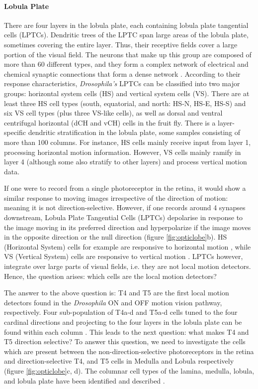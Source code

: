 \paragraph{Lobula Plate}
There are four layers in the lobula plate, each containing lobula plate tangential cells (LPTCs). Dendritic trees of the LPTC span large areas of the lobula plate, sometimes covering the entire layer. Thus, their receptive fields cover a large portion of the visual field. The neurons that make up this group are composed of more than 60 different types, and they form a complex network of electrical and chemical synaptic connections that form a dense network \parencite{Borst2010}. According to their response characteristics, \textit{Drosophila's} LPTCs can be classified into two major groups: horizontal system cells (HS) and vertical system cells (VS). There are at least three HS cell types (south, equatorial, and north: HS-N, HS-E, HS-S) and six VS cell types (plus three VS-like cells), as well as dorsal and ventral centrifugal horizontal (dCH and vCH) cells in the fruit fly. There is a layer-specific dendritic stratification in the lobula plate, some samples consisting of more than 100 columns. For instance, HS cells mainly receive input from layer 1, processing horizontal motion information. However, VS cells mainly ramify in layer 4 (although some also stratify to other layers) and process vertical motion data.

If one were to record from a single photoreceptor in the retina, it would show a similar response to moving images irrespective of the direction of motion: meaning it is not direction-selective. However, if one records around 4 synapses downstream, Lobula Plate Tangential Cells (LPTCs) depolarise in response to the image moving in its preferred direction and hyperpolarize if the image moves in the opposite direction or the null direction (figure \ref{fig:opticlobe}b). HS (Horizontal System) cells for example are responsive to horizontal motion \parencite{Schnell2010}, while VS (Vertical System) cells are responsive to vertical motion \parencite{Joesch2008}. LPTCs however, integrate over large parts of visual fields, i.e. they are not local motion detectors. Hence, the question arises: which cells are the local motion detectors? 

The answer to the above question is: T4 and T5 are the first local motion detectors found in the \textit{Drosophila} ON and OFF motion vision pathway, respectively. Four sub-population of T4a-d and T5a-d cells tuned to the four cardinal directions and projecting to the four layers in the lobula plate can be found within each column \parencite{Maisak2013}. This leads to the next question: what makes T4 and T5 direction selective? To answer this question, we need to investigate the cells which are present between the non-direction-selective photoreceptors in the retina and direction-selective T4, and T5 cells in Medulla and Lobula respectively (figure \ref{fig:opticlobe}c, d). The columnar cell types of the lamina, medulla, lobula, and lobula plate have been identified and described \parencite{Fischbach1989, RamonyCajal1915}.  

